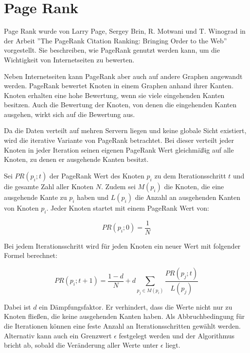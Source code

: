 \section{Page Rank}
\label{pageRank}

Page Rank wurde von Larry Page, Sergey Brin, R. Motwani und T. Winograd in der Arbeit ''The PageRank Citation Ranking:
Bringing Order to the Web''\cite{Page98thepagerank} vorgestellt. Sie beschreiben, wie PageRank genutzt werden kann, um die Wichtigkeit von Internetseiten zu bewerten.

Neben Internetseiten kann PageRank aber auch auf andere Graphen angewandt werden.
PageRank bewertet Knoten in einem Graphen anhand ihrer Kanten. Knoten erhalten eine hohe Bewertung, wenn sie viele eingehenden Kanten besitzen. Auch die Bewertung der Knoten, von denen die eingehenden Kanten ausgehen, wirkt sich auf die Bewertung aus.

Da die Daten verteilt auf mehren Servern liegen und keine globale Sicht existiert, wird die iterative Variante von PageRank betrachtet.
Bei dieser verteilt jeder Knoten in jeder Iteration seinen eigenen PageRank Wert gleichmäßig auf alle Knoten, zu denen er ausgehende Kanten besitzt. 


Sei $ PR(p_{i}; t)$ der PageRank Wert des Knoten $p_{i}$ zu dem Iterationsschritt $t$ und die gesamte Zahl aller Knoten $N$.
Zudem sei $M(p_{i})$ die Knoten, die eine ausgehende Kante zu $p_{i}$ haben und $L(p_{i})$ die Anzahl an ausgehenden Kanten von Knoten $p_{i}$.
Jeder Knoten startet mit einem PageRank Wert von:

\[  PR(p_{i}; 0) = \frac{1}{N}   \]

Bei jedem Iterationsschritt wird für jeden Knoten ein neuer Wert mit folgender Formel berechnet:

\[ PR(p_{i}; t+1) = \frac{1 - d}{N} + d \sum_{p_{j} \in M(p_{i})} \frac{PR(p_{j}; t)}{L(p_{j})} \]


Dabei ist $d$ ein Dämpfungsfaktor. Er verhindert, dass die Werte nicht nur zu Knoten fließen, die keine ausgehenden Kanten haben.
Als Abbruchbedingung für die Iterationen können eine feste Anzahl an Iterationsschritten gewählt werden. Alternativ kann auch ein Grenzwert $\epsilon$ festgelegt werden und der Algorithmus bricht ab, sobald die Veränderung aller Werte unter $\epsilon$ liegt.
